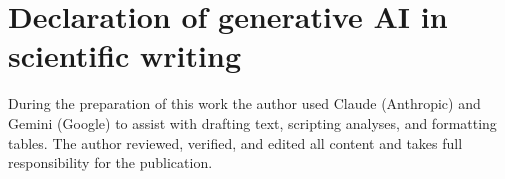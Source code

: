 \documentclass{article}
\begin{document}
\section{Declaration of generative AI in scientific writing}
\label{app:ai_decl}

During the preparation of this work the author used Claude (Anthropic) and Gemini (Google) to assist with drafting text, scripting analyses, and formatting tables. The author reviewed, verified, and edited all content and takes full responsibility for the publication.
\end{document}
